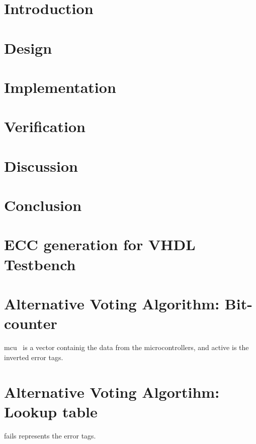 \documentclass[titlepage,12pt,a4paper]{article}
\begin{document}


\newpage
\tableofcontents
\listoffigures
\listoftables

\newpage
{}

\section{Introduction}

\newpage
\section{Design}
\label{sec:design}

\newpage
\section{Implementation}

\newpage
\section{Verification}

\newpage
\section{Discussion}

\newpage
\section{Conclusion}

\newpage

\appendix
\section{ECC generation for VHDL Testbench}
\label{apx:ecc}

\newpage
\section{Alternative Voting Algorithm: Bit-counter}
\label{apx:bitcnt}
{\ttfamily mcu}  is a vector containig the data from the microcontrollers,
and {\ttfamily active} is the inverted error tags.


\section{Alternative Voting Algortihm: Lookup table}
\label{apx:table}
{\ttfamily fails} represents the error tags.




\end{document}
